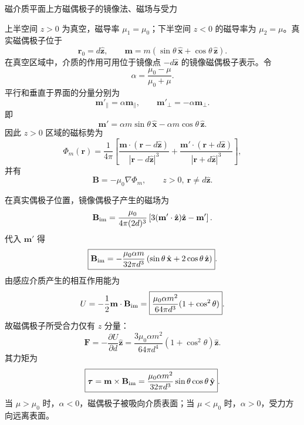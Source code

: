 \begin{question}
磁介质平面上方磁偶极子的镜像法、磁场与受力
\begin{solution}
上半空间 $z>0$ 为真空，磁导率 $\mu_1=\mu_0$；下半空间 $z<0$ 的磁导率为 $\mu_2=\mu$。真实磁偶极子位于
\[
  \mathbf r_0=d\hat{\mathbf z},
  \qquad
  \mathbf m=m(\sin\theta\,\hat{\mathbf x}+\cos\theta\,\hat{\mathbf z}).
\]
在真空区域中，介质的作用可用位于镜像点 $-d\hat{\mathbf z}$ 的镜像磁偶极子表示。令
\[
  \alpha=\frac{\mu_0-\mu}{\mu_0+\mu}.
\]
平行和垂直于界面的分量分别为
\[
  \boxed{
  \mathbf m'_{\parallel}=\alpha\mathbf m_{\parallel}},
  \qquad
  \boxed{
  \mathbf m'_{\perp}=-\alpha\mathbf m_{\perp}}.
\]
即
\[
  \boxed{
  \mathbf m'=\alpha m\sin\theta\,\hat{\mathbf x}
  -\alpha m\cos\theta\,\hat{\mathbf z}}.
\]
因此 $z>0$ 区域的磁标势为
\[
  \boxed{
  \Phi_m(\mathbf r)=\frac{1}{4\pi}
  \left[
  \frac{\mathbf m\cdot(\mathbf r-d\hat{\mathbf z})}
  {|\mathbf r-d\hat{\mathbf z}|^3}
  +
  \frac{\mathbf m'\cdot(\mathbf r+d\hat{\mathbf z})}
  {|\mathbf r+d\hat{\mathbf z}|^3}
  \right]},
\]
并有
\[
  \boxed{\mathbf B=-\mu_0\nabla\Phi_m},
  \qquad z>0,\ \mathbf r\ne d\hat{\mathbf z}.
\]

在真实偶极子位置，镜像偶极子产生的磁场为
\[
  \mathbf B_{\rm im}
  =\frac{\mu_0}{4\pi(2d)^3}
  \left[3(\mathbf m'\cdot\hat{\mathbf z})\hat{\mathbf z}-\mathbf m'\right].
\]
代入 $\mathbf m'$ 得
\[
  \boxed{
  \mathbf B_{\rm im}
  =-\frac{\mu_0\alpha m}{32\pi d^3}
  \left(\sin\theta\,\hat{\mathbf x}
  +2\cos\theta\,\hat{\mathbf z}
  \right)}.
\]
由感应介质产生的相互作用能为
\[
  U=-\frac12\mathbf m\cdot\mathbf B_{\rm im}
  =\boxed{
  \frac{\mu_0\alpha m^2}{64\pi d^3}
  (1+\cos^2\theta)}.
\]
故磁偶极子所受合力仅有 $z$ 分量：
\[
  \boxed{
  \mathbf F=-\frac{\partial U}{\partial d}\hat{\mathbf z}
  =\frac{3\mu_0\alpha m^2}{64\pi d^4}
  (1+\cos^2\theta)\hat{\mathbf z}}.
\]
其力矩为
\[
  \boxed{
  \boldsymbol\tau=\mathbf m\times\mathbf B_{\rm im}
  =\frac{\mu_0\alpha m^2}{32\pi d^3}
  \sin\theta\cos\theta\,\hat{\mathbf y}}.
\]
当 $\mu>\mu_0$ 时，$\alpha<0$，磁偶极子被吸向介质表面；当 $\mu<\mu_0$ 时，$\alpha>0$，受力方向远离表面。
\end{solution}
\end{question}


